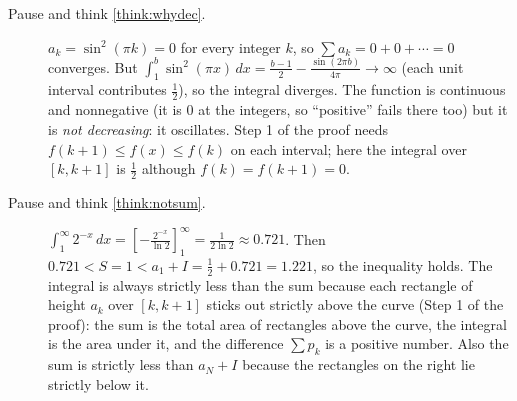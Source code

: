 \documentclass[11pt]{article}
\begin{document}
\begin{description}
  \item[Pause and think \ref{think:whydec}.] $a_k=\sin^2(\pi k)=0$ for every integer $k$, so $\sum a_k=0+0+\cdots=0$ converges. But $\int_1^b\sin^2(\pi x)\,dx=\frac{b-1}2-\frac{\sin(2\pi b)}{4\pi}\to\infty$ (each unit interval contributes $\frac12$), so the integral diverges. The function is continuous and nonnegative (it is $0$ at the integers, so ``positive'' fails there too) but it is \emph{not decreasing}: it oscillates. Step 1 of the proof needs $f(k+1)\le f(x)\le f(k)$ on each interval; here the integral over $[k,k+1]$ is $\frac12$ although $f(k)=f(k+1)=0$.
  \item[Pause and think \ref{think:notsum}.] $\int_1^\infty2^{-x}\,dx=\left[-\frac{2^{-x}}{\ln2}\right]_1^\infty=\frac1{2\ln2}\approx0.721$. Then $0.721<S=1<a_1+I=\frac12+0.721=1.221$, so the inequality holds. The integral is always strictly less than the sum because each rectangle of height $a_k$ over $[k,k+1]$ sticks out strictly above the curve (Step 1 of the proof): the sum is the total area of rectangles above the curve, the integral is the area under it, and the difference $\sum p_k$ is a positive number. Also the sum is strictly less than $a_N+I$ because the rectangles on the right lie strictly below it.
\end{description}
\end{document}
